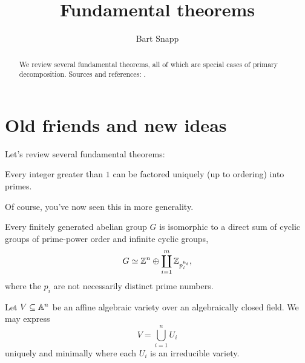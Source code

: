 \documentclass{ximera}
\author{Bart Snapp}
\title{Fundamental theorems}
\begin{document}
\begin{abstract}
  We review several fundamental theorems, all of which are special
  cases of primary decomposition. Sources and references:
  \cite{dE1995,hS2003}.
\end{abstract}
\maketitle

\section{Old friends and new ideas}

Let's review several fundamental theorems:

\begin{theorem}
  Every integer greater than $1$ can be factored uniquely (up to
  ordering) into primes.
\end{theorem}

Of course, you've now seen this in more generality.


\begin{theorem}
  Every finitely generated abelian group $G$ is isomorphic to a
  direct sum of cyclic groups of prime-power order and infinite cyclic
  groups,
  \[
  G \simeq \mathbb Z^n \oplus \coprod_{i=1}^{m} \mathbb Z_{p_i^{k_i}},
  \]
  where the $p_i$ are not necessarily distinct prime numbers.
\end{theorem}


\begin{theorem}
  Let $V\subseteq\mathbb A^n$ be an affine algebraic variety over an
  algebraically closed field. We may express
  \[
  V = \bigcup_{i=1}^n U_i
  \]
  uniquely and minimally where each $U_i$ is an irreducible variety.
\end{theorem}
\end{document}
